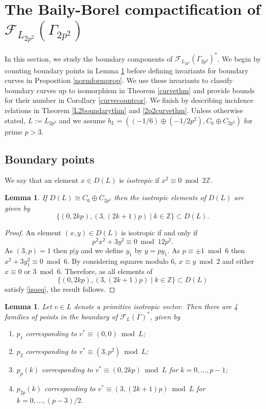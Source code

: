 \documentclass[11pt]{article}
\newtheorem{lem}[thm]{Lemma}
\newcommand{\ZZ}{\mathbb{Z}}
\newcommand{\fc}{\mathcal{F}}
\newcommand{\op}{\oplus}
\newcommand{\beq}{\begin{equation*}}
\newcommand{\eeq}{\end{equation*}}
\begin{document}
\section{The Baily-Borel compactification of $\fc_{L_{2p^2}}(\Gamma_{2p^2})$}
In this section, we study the boundary components of $\fc_{L_{2p^2}}(\Gamma_{2p^2})^*$.
We begin by counting  boundary points in Lemma \ref{2p2lineslem} before defining invariants for boundary curves in  Proposition \ref{normformprop}.
We use these invariants to classify  boundary curves up to isomorphism in Theorem \ref{curvethm} and provide bounds for their number  in Corollary  \ref{curvecountcor}.
We finish by describing incidence relations in Theorem \ref{L2boundarythm} and \ref{2p2curvethm}.
Unless otherwise stated, $L:=L_{2p^2}$  and we assume $b_L = ( (-1/6) \op (-1/2p^2), C_6 \op C_{2p^2})$ for prime $p>3$.
\subsection{Boundary points}
We say that an element $x \in D(L)$ is \emph{isotropic} if $x^2 \equiv 0 \bmod{ 2\ZZ}$.
\begin{lem}\label{isoveclem}
  If $D(L) \cong C_6 \op C_{2p^2}$ then the isotropic elements of $D(L)$ are given by
  \beq
  \{ (0, 2kp), (3, (2k+1)p) \mid k \in \ZZ\} \subset D(L).
  \eeq
\end{lem}
\begin{proof}
  An element $(x, y) \in D(L)$ is isotropic if and only if
    \begin{equation}\label{isoeq}
    p^2 x^2 + 3y^2 \equiv 0 \bmod{ 12p^2}.
    \end{equation}
    As $(3,p)=1$ then $p \vert y$ and we define $y_1$ by $y = py_1$.
    As $p \equiv \pm 1 \bmod{ 6}$ then  $x^2 + 3y_1^2 \equiv 0 \bmod{ 6}$.
    By considering squares modulo 6, $x \equiv y \bmod{ 2}$ and either $x \equiv 0$ or  $3 \bmod{6}$.
    Therefore, as all elements of
    \beq
    \{ (0, 2kp), (3, (2k+1)p) \mid k \in \ZZ\} \subset D(L)
    \eeq
    satisfy \eqref{isoeq}, the result follows.
\end{proof}
\begin{lem}\label{2p2lineslem}
  Let $v \in L$ denote a primitive isotropic vector.
  Then there are 4 families of points in the boundary of $\fc_L(\Gamma)^*$, given by
  \begin{enumerate}
  \item  $p_1$ corresponding to  $v^* \equiv (0,0) \bmod{ L}$;
  \item $p_2$ corresponding to  $v^* \equiv (3,p^2) \bmod{ L}$;
  \item $p_p(k)$ corresponding to  $v^* \equiv (0, 2kp) \bmod{ L}$ for $k=0, \ldots, p-1$;
  \item $p_{2p}(k)$ corresponding to $v^* \equiv (3,(2k+1)p) \bmod{ L}$ for $k=0, \ldots, (p-3)/2$.
    \end{enumerate}
\end{lem}
\end{document}
